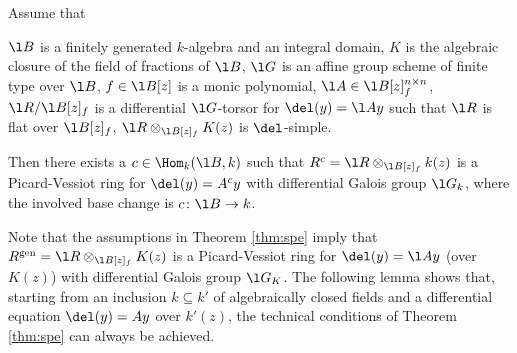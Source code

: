 \documentclass[a4paper, 11pt]{article}
\begin{document}
\begin{theorem} \label{thm:spe}
	Assume that
	\begin{itemize}
		\ibul $\l B$ is a finitely generated $k$-algebra and an integral domain,
		\ibul $K$ is the algebraic closure of the field of fractions of $\l B$,
		\ibul $\l G$ is an affine group scheme of finite type over $\l B$,
		\ibul $f \in \l B[z]$ is a monic polynomial,
		\ibul $\l A \in \l B[z]^{n \times n}_f$,
		\ibul $\l R/\l B[z]_f$ is a differential $\l G$-torsor for $\del(y) = \l A y$ such that $\l R$ is flat over $\l B[z]_f$,
		\ibul $\l R \otimes_{\l B[z]_f} K(z)$ is $\del$-simple.
	\end{itemize}
	Then there exists a $c \in \Hom_{k}(\l B, k)$ such that $R^c=\l R \otimes_{\l B[z]_f} k(z)$ is a Picard-Vessiot ring for $\del(y)=A^cy$ with differential Galois group $\l G_k$, where the involved base change is $c\colon \l B \to k$.
	
\end{theorem}

Note that the assumptions in Theorem \ref{thm:spe} imply that $R^{\textup{gen}}=\l R \otimes_{\l B[z]_f} K(z)$ is a Picard-Vessiot ring for $\del(y)=\l A y$ (over $K(z)$) with differential Galois group $\l G_K$. The following lemma shows that, starting from an inclusion $k\subseteq k'$ of algebraically closed fields and a differential equation $\del(y)=Ay$ over $k'(z)$, the technical conditions of Theorem \ref{thm:spe} can always be achieved.


%
\end{document}
